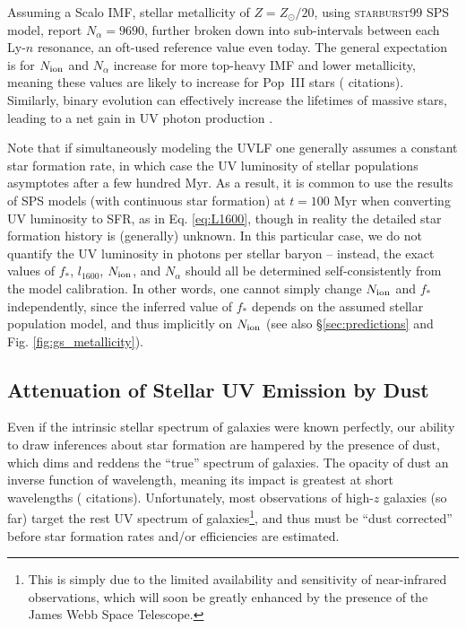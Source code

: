 Assuming a Scalo IMF, stellar metallicity of $Z=Z_{\odot}/20$, using \textsc{starburst99} SPS model, \cite{Barkana2005} report $N_{\alpha}=9690$, further broken down into sub-intervals between each Ly-$n$ resonance, an oft-used reference value even today. The general expectation is for $N_{\text{ion}}$ and $N_{\alpha}$ increase for more top-heavy IMF and lower metallicity, meaning these values are likely to increase for Pop~III stars ({\color{red} citations}). Similarly, binary evolution can effectively increase the lifetimes of massive stars, leading to a net gain in UV photon production \cite{Stanway2016}.

Note that if simultaneously modeling the UVLF one generally assumes a constant star formation rate, in which case the UV luminosity of stellar populations asymptotes after a few hundred Myr. As a result, it is common to use the results of SPS models (with continuous star formation) at $t=100$ Myr when converting UV luminosity to SFR, as in Eq. \ref{eq:L1600}, though in reality the detailed star formation history is (generally) unknown. In this particular case, we do not quantify the UV luminosity in photons per stellar baryon -- instead, the exact values of $f_{\ast}$, $l_{1600}$, $N_{\text{ion}}$, and $N_{\alpha}$ should all be determined self-consistently from the model calibration. In other words, one cannot simply change $N_{\text{ion}}$ and $f_{\ast}$ independently, since the inferred value of $f_{\ast}$ depends on the assumed stellar population model, and thus implicitly on $N_{\text{ion}}$ (see also \S\ref{sec:predictions} and Fig.  \ref{fig:gs_metallicity}).


\subsection{Attenuation of Stellar UV Emission by Dust} \label{sec:dust}
Even if the intrinsic stellar spectrum of galaxies were known perfectly, our ability to draw inferences about star formation are hampered by the presence of dust, which dims and reddens the ``true'' spectrum of galaxies. The opacity of dust an inverse function of wavelength, meaning its impact is greatest at short wavelengths ({\color{red} citations}). Unfortunately, most observations of high-$z$ galaxies (so far) target the rest UV spectrum of galaxies\footnote{This is simply due to the limited availability and sensitivity of near-infrared observations, which will soon be greatly enhanced by the presence of the James Webb Space Telescope.}, and thus must be ``dust corrected'' before star formation rates and/or efficiencies are estimated. 

